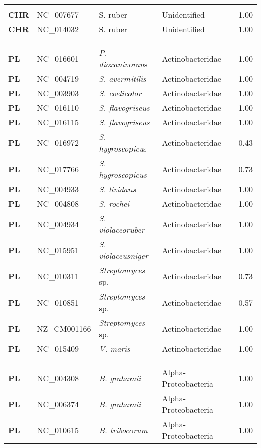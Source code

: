 \begin{adjustwidth}{-3cm}{2cm}
{\begin{supertabular}{>{\bfseries}l|p{0.1\textwidth}p{0.14\textwidth}l|l}
\hline\\
CHR & NC\_007677 & S. ruber & Unidentified & 1.00\\
CHR & NC\_014032 & S. ruber & Unidentified & 1.00\\
\\
\\
\hline\\
PL & NC\_016601 & \textit{P. dioxanivoran}s & Actinobacteridae & 1.00\\
PL & NC\_004719 & \textit{S. avermitilis} & Actinobacteridae & 1.00\\
PL & NC\_003903 & \textit{S. coelicolor} & Actinobacteridae & 1.00\\
PL & NC\_016110 & \textit{S. flavogriseus} & Actinobacteridae & 1.00\\
PL & NC\_016115 & \textit{S. flavogriseus} & Actinobacteridae & 1.00\\
PL & NC\_016972 & \textit{S. hygroscopicu}s & Actinobacteridae & 0.43\\
PL & NC\_017766 & \textit{S. hygroscopicus} & Actinobacteridae & 0.73\\
PL & NC\_004933 & \textit{S. lividans} & Actinobacteridae & 1.00\\
PL & NC\_004808 & \textit{S. rochei} & Actinobacteridae & 1.00\\
PL & NC\_004934 & \textit{S. violaceoruber} & Actinobacteridae & 1.00\\
PL & NC\_015951 & \textit{S. violaceusniger} & Actinobacteridae & 1.00\\
PL & NC\_010311 & \textit{Streptomyces} sp. & Actinobacteridae & 0.73\\
PL & NC\_010851 & \textit{Streptomyces} sp. & Actinobacteridae & 0.57\\
PL & NZ\_CM001166 & \textit{Streptomyces} sp. & Actinobacteridae & 1.00\\
PL & NC\_015409 & \textit{V. maris} & Actinobacteridae & 1.00\\
\\
\\
\hline\\
PL & NC\_004308 & \textit{B. grahamii} & Alpha-Proteobacteria & 1.00\\
PL & NC\_006374 & \textit{B. grahamii} & Alpha-Proteobacteria & 1.00\\
PL & NC\_010615 & \textit{B. tribocorum} & Alpha-Proteobacteria & 1.00\\

\end{supertabular}}
\end{adjustwidth}
